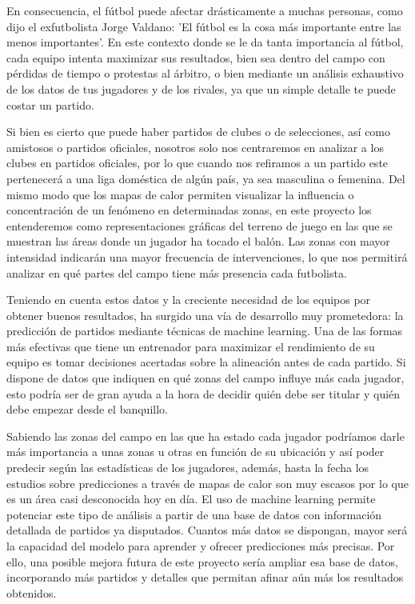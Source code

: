 En consecuencia, el fútbol puede afectar drásticamente a muchas personas, como dijo el exfutbolista Jorge Valdano: 'El fútbol es la cosa más importante entre las menos importantes'.
En este contexto donde se le da tanta importancia al fútbol, cada equipo intenta maximizar sus resultados, bien sea dentro del campo con pérdidas de tiempo o protestas al árbitro, o bien mediante un análisis exhaustivo de los datos de tus jugadores y de los rivales, ya que un simple detalle te puede costar un partido. 

Si bien es cierto que puede haber partidos de clubes o de selecciones, así como amistosos o partidos oficiales, nosotros solo nos centraremos en analizar a los clubes en partidos oficiales, por lo que cuando nos refiramos a un partido este pertenecerá a una liga doméstica de algún país, ya sea masculina o femenina. Del mismo modo que los mapas de calor permiten visualizar la influencia o concentración de un fenómeno en determinadas zonas, en este proyecto los entenderemos como representaciones gráficas del terreno de juego en las que se muestran las áreas donde un jugador ha tocado el balón. Las zonas con mayor intensidad indicarán una mayor frecuencia de intervenciones, lo que nos permitirá analizar en qué partes del campo tiene más presencia cada futbolista.

Teniendo en cuenta estos datos y la creciente necesidad de los equipos por obtener buenos resultados, ha surgido una vía de desarrollo muy prometedora: la predicción de partidos mediante técnicas de machine learning. Una de las formas más efectivas que tiene un entrenador para maximizar el rendimiento de su equipo es tomar decisiones acertadas sobre la alineación antes de cada partido. Si dispone de datos que indiquen en qué zonas del campo influye más cada jugador, esto podría ser de gran ayuda a la hora de decidir quién debe ser titular y quién debe empezar desde el banquillo.

Sabiendo las zonas del campo en las que ha estado cada jugador podríamos darle más importancia a unas zonas u otras en función de su ubicación y así poder predecir según las estadísticas de los jugadores, además, hasta la fecha los estudios sobre predicciones a través de mapas de calor son muy escasos por lo que es un área casi desconocida hoy en día. El uso de machine learning permite potenciar este tipo de análisis a partir de una base de datos con información detallada de partidos ya disputados. Cuantos más datos se dispongan, mayor será la capacidad del modelo para aprender y ofrecer predicciones más precisas. Por ello, una posible mejora futura de este proyecto sería ampliar esa base de datos, incorporando más partidos y detalles que permitan afinar aún más los resultados obtenidos.

